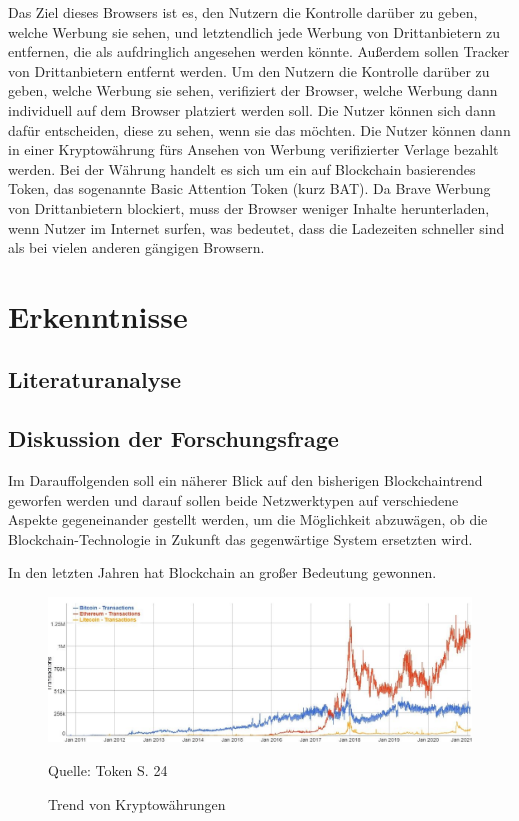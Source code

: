 Das Ziel dieses Browsers ist es, den Nutzern die Kontrolle darüber zu geben, welche Werbung sie sehen, und letztendlich jede Werbung von Drittanbietern zu entfernen, die als aufdringlich angesehen werden könnte. 
Außerdem sollen Tracker von Drittanbietern entfernt werden.
Um den Nutzern die Kontrolle darüber zu geben, welche Werbung sie sehen, verifiziert der Browser, welche Werbung dann individuell auf dem Browser platziert werden soll.
Die Nutzer können sich dann dafür entscheiden, diese zu sehen, wenn sie das möchten.
Die Nutzer können dann in einer Kryptowährung fürs Ansehen von Werbung verifizierter Verlage bezahlt werden.
Bei der Währung handelt es sich um ein auf Blockchain basierendes Token, das sogenannte Basic Attention Token (kurz BAT).
Da Brave Werbung von Drittanbietern blockiert, muss der Browser weniger Inhalte herunterladen, wenn Nutzer im Internet surfen, was bedeutet, dass die Ladezeiten schneller sind  als bei vielen anderen gängigen Browsern.







\newpage
\section{Erkenntnisse}

\subsection{Literaturanalyse}
\subsection{Diskussion der Forschungsfrage}
Im Darauffolgenden soll ein näherer Blick auf den bisherigen Blockchaintrend geworfen werden und darauf sollen beide Netzwerktypen auf verschiedene Aspekte gegeneinander gestellt werden, um die Möglichkeit abzuwägen, ob die Blockchain-Technologie in Zukunft das gegenwärtige System ersetzten wird.

In den letzten Jahren hat Blockchain an großer Bedeutung gewonnen.

\begin{figure}[!ht]
    \caption{Trend von Kryptowährungen}
    \includegraphics[scale=1]{assets/figures/blockchain_trend.jpg}
    \begin{flushleft}
        Quelle: Token S. 24
    \end{flushleft}
    \label{fig:birds8}
\end{figure}



